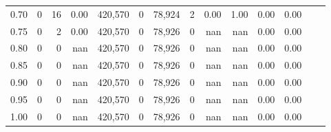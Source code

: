 \begin{tabular}{rrrrrrrrrrrrrr}
0.70 &        0 &      16 &     0.00 &  420,570 &        0 &  78,924 &       2 &  0.00 &  1.00 &  0.00 &      0.00 \\
0.75 &        0 &       2 &     0.00 &  420,570 &        0 &  78,926 &       0 &   nan &   nan &  0.00 &      0.00 \\
0.80 &        0 &       0 &      nan &  420,570 &        0 &  78,926 &       0 &   nan &   nan &  0.00 &      0.00 \\
0.85 &        0 &       0 &      nan &  420,570 &        0 &  78,926 &       0 &   nan &   nan &  0.00 &      0.00 \\
0.90 &        0 &       0 &      nan &  420,570 &        0 &  78,926 &       0 &   nan &   nan &  0.00 &      0.00 \\
0.95 &        0 &       0 &      nan &  420,570 &        0 &  78,926 &       0 &   nan &   nan &  0.00 &      0.00 \\
1.00 &        0 &       0 &      nan &  420,570 &        0 &  78,926 &       0 &   nan &   nan &  0.00 &      0.00 \\
\bottomrule
\end{tabular}
